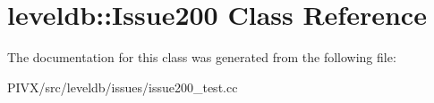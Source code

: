 \hypertarget{classleveldb_1_1_issue200}{}\section{leveldb\+:\+:Issue200 Class Reference}
\label{classleveldb_1_1_issue200}


The documentation for this class was generated from the following file\+:\begin{DoxyCompactItemize}
\item 
P\+I\+V\+X/src/leveldb/issues/issue200\+\_\+test.\+cc\end{DoxyCompactItemize}
